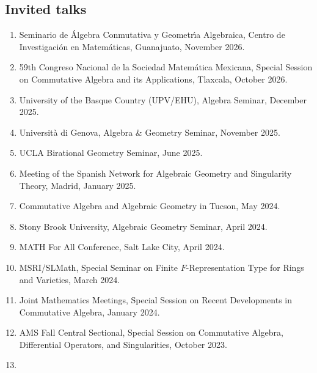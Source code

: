 \documentclass{res}
\begin{document}
\begin{resume}
\section{Invited talks}
\begin{enumerate}
\item 
Seminario de \'Algebra Conmutativa y Geometr\'{\i}a Algebraica, Centro de Investigaci\'on en Matem\'aticas, Guanajuato, November 2026.
\item
59th Congreso Nacional de la Sociedad Matem\'atica Mexicana, Special Session on Commutative Algebra and its Applications, Tlaxcala, October 2026.
\item
University of the Basque Country (UPV/EHU), Algebra Seminar, December 2025.
\item
Universit\`a di Genova, Algebra \& Geometry Seminar, November 2025.
\item
UCLA Birational Geometry Seminar, June 2025.
\item 
Meeting of the Spanish Network for Algebraic Geometry and Singularity Theory, Madrid, January 2025.
\item
Commutative Algebra and Algebraic Geometry in Tucson, May 2024.
\item 
Stony Brook University, Algebraic Geometry Seminar, April 2024.
\item
MATH For All Conference, Salt Lake City, April 2024.
\item 
MSRI/SLMath, Special Seminar on Finite $F$-Representation Type for Rings and Varieties, March 2024.
\item
Joint Mathematics Meetings, Special Session on Recent Developments in Commutative Algebra, January 2024.
\item 
AMS Fall Central Sectional, Special Session on Commutative Algebra, Differential Operators, and Singularities, October 2023.
\item 

\end{enumerate}
\end{resume}
\end{document}
